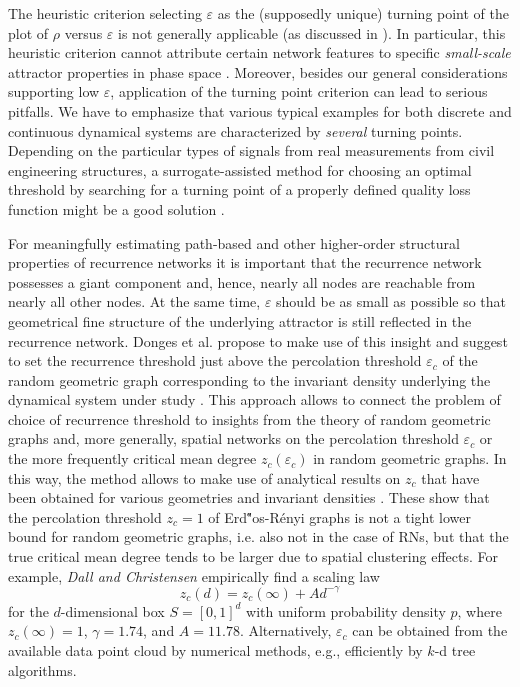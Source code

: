 		The heuristic criterion selecting $\varepsilon$ as the (supposedly unique) turning point of the plot of $\rho$ versus $\varepsilon$ \cite{Gao2009} is not generally applicable (as discussed in \cite{Donner2010b}). In particular, this heuristic criterion cannot attribute certain network features to specific \textit{small-scale} attractor properties in phase space \cite{Donner2010b}. Moreover, besides our general considerations supporting low $\varepsilon$, application of the turning point criterion can lead to serious pitfalls. We have to emphasize that various typical examples for both discrete and continuous dynamical systems are characterized by \textit{several} turning points. Depending on the particular types of signals from real measurements from civil engineering structures, a surrogate-assisted method for choosing an optimal threshold by searching for a turning point of a properly defined quality loss function might be a good solution \cite{Yang2015a}.

		For meaningfully estimating path-based and other higher-order structural properties of recurrence networks it is important that the recurrence network possesses a giant component and, hence, nearly all nodes are reachable from nearly all other nodes. At the same time, $\varepsilon$ should be as small as possible so that geometrical fine structure of the underlying attractor is still reflected in the recurrence network. Donges et al. propose to make use of this insight and suggest to set the recurrence threshold just above the percolation threshold $\varepsilon_c$ of the random geometric graph corresponding to the invariant density underlying the dynamical system under study \cite{Donges2012}. This approach allows to connect the problem of choice of recurrence threshold to insights from the theory of random geometric graphs \cite{Dall2002,penrose2003random,herrmann2003connectivity} and, more generally, spatial networks \cite{Gastner2006e,Barthelemy2011,Wiedermann2016} on the percolation threshold $\varepsilon_c$ or the more frequently critical mean degree $z_c(\varepsilon_c)$ in random geometric graphs. In this way, the method allows to make use of analytical results on $z_c$ that have been obtained for various geometries and invariant densities \cite{Dall2002}. These show that the percolation threshold $z_c=1$ of Erd\H"os-R\'enyi graphs is not a tight lower bound for random geometric graphs, i.e. also not in the case of RNs, but that the true critical mean degree tends to be larger due to spatial clustering effects. For example, \textit{Dall and Christensen}\cite{Dall2002} empirically find a scaling law
		\begin{equation}
		z_c(d) = z_c(\infty) + A d^{-\gamma}
		\end{equation}
		for the $d$-dimensional box $S=[0,1]^d$ with uniform probability density $p$, where $z_c(\infty) = 1$, $\gamma = 1.74$, and $A = 11.78$. Alternatively, $\varepsilon_c$ can be obtained from the available data point cloud by numerical methods, e.g., efficiently by $k$-d tree algorithms.

